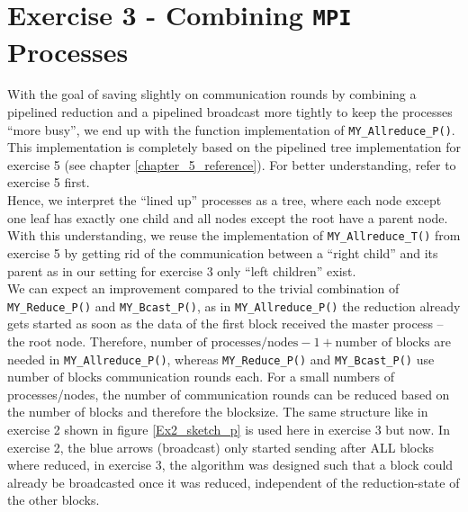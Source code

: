 \section{Exercise 3 - Combining \texttt{MPI} Processes}

With the goal of saving slightly on communication rounds by combining a pipelined reduction and a 
pipelined broadcast more tightly to keep the processes “more busy”, we end up with the function implementation 
of \texttt{MY\_Allreduce\_P()}. This implementation is completely based on the pipelined tree 
implementation for exercise 5 (see chapter \ref{chapter_5_reference}). For better understanding, refer to exercise 5 first.\\

Hence, we interpret the “lined up” processes as a tree, where each node except one leaf has exactly 
one child and all nodes except the root have a parent node. With this understanding, we reuse the 
implementation of \texttt{MY\_Allreduce\_T()} from exercise 5 by getting rid of the communication between 
a “right child” and its parent as in our setting for exercise 3 only “left children” exist.\\

We can expect an improvement compared to the trivial combination of \texttt{MY\_Reduce\_P()} and 
\texttt{MY\_Bcast\_P()}, as in \texttt{MY\_Allreduce\_P()} the reduction already gets started as soon 
as the data of the first block received the master process -- the root node. Therefore, 
$\text{number of processes/nodes} - 1 + \text{number of blocks}$ are needed in \texttt{MY\_Allreduce\_P()}, 
whereas \texttt{MY\_Reduce\_P()} and \texttt{MY\_Bcast\_P()} use $\text{number of blocks}$ communication rounds 
each. For a small numbers of processes/nodes, the number of communication rounds can be reduced based 
on the number of blocks and therefore the blocksize. The same structure like in exercise 2 shown
in figure \ref{Ex2_sketch_p} is used here in exercise 3 but now. In exercise 2, the blue arrows (broadcast)
only started sending after ALL blocks where reduced, in exercise 3, the algorithm was designed such that
a block could already be broadcasted once it was reduced, independent of the reduction-state of the other blocks.\\



